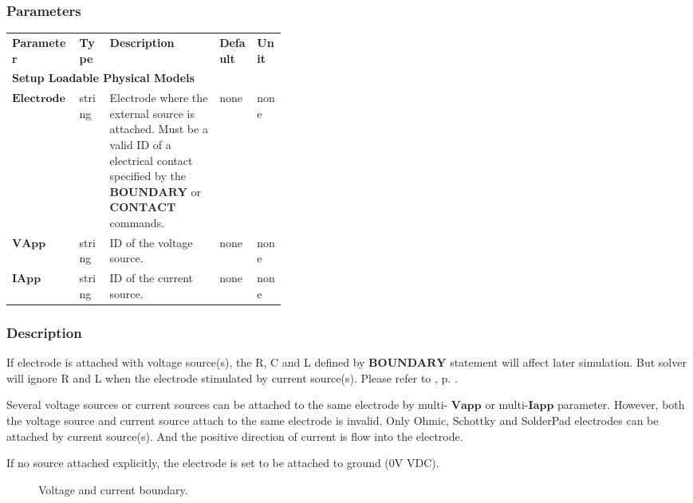 \documentclass[oneside,12pt]{cgd_book}
\begin{document}
\subsubsection{Parameters}
\begin{longtable}{ll>{\raggedright}p{0.4\linewidth}ll}
\textbf{Parameter} & \textbf{Type} & \textbf{Description} & \textbf{Default} & \textbf{Unit} \\
\multicolumn{5}{l}{\textbf{Setup Loadable Physical Models}}
\\
 $\mathbf{Electrode}$
& string
& Electrode where the external source is attached. Must be a valid ID of a electrical contact
                    specified by the $\mathbf{BOUNDARY}$ or $\mathbf{CONTACT}$
commands.
& none
& none
\\
 $\mathbf{VApp}$
& string
& ID of the voltage source.
& none
& none
\\
 $\mathbf{IApp}$
& string
& ID of the current source.
& none
& none\\
\end{longtable}

\par
\subsubsection{Description}
If electrode is attached with voltage source(s), the R, C and L defined by
$\mathbf{BOUNDARY}$ statement will affect later simulation. But solver will ignore R and L when the electrode stimulated by
          current source(s). Please refer to ,
p. \pageref{fig:CmdRef:Attach:Electrode}.
\par
Several voltage sources or current sources can be attached to the same electrode by multi-
$\mathbf{Vapp}$ or multi-$\mathbf{ Iapp}$ parameter. However, both the voltage source
          and current source attach to the same electrode is invalid. Only Ohmic, Schottky and SolderPad electrodes can
          be attached by current source(s). And the positive direction of current is flow into the electrode.
\par
If no source attached explicitly, the electrode is set to be attached to ground (0V VDC).
\par

\begin{figure}[H]
\caption{\label{fig:CmdRef:Attach:Electrode}Voltage and current boundary.}
\end{figure}
\end{document}

